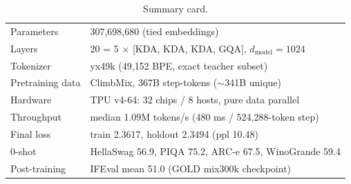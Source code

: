 \begin{table}[h]
\centering
\small
\caption{Summary card.}
\label{tab:summary}
\begin{tabular}{ll}
\toprule
Parameters & 307{,}698{,}680 (tied embeddings) \\
Layers & 20 = 5 $\times$ [KDA, KDA, KDA, GQA], $d_{\mathrm{model}}=1024$ \\
Tokenizer & yx49k (49{,}152 BPE, exact teacher subset) \\
Pretraining data & ClimbMix, 367B step-tokens ($\sim$341B unique) \\
Hardware & TPU v4-64: 32 chips / 8 hosts, pure data parallel \\
Throughput & median 1.09M tokens/s (480 ms / 524{,}288-token step) \\
Final loss & train 2.3617, holdout 2.3494 (ppl 10.48) \\
0-shot & HellaSwag 56.9, PIQA 75.2, ARC-e 67.5, WinoGrande 59.4 \\
Post-training & IFEval mean 51.0 (GOLD mix300k checkpoint) \\
\bottomrule
\end{tabular}
\end{table}
